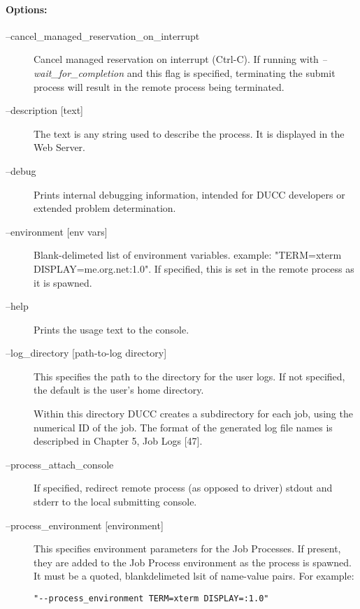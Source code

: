     \paragraph{Options:}
    \begin{description}
    
        \item[--cancel\_managed\_reservation\_on\_interrupt ] Cancel managed reservation on interrupt
          (Ctrl-C).  If running with {\em--wait\_for\_completion} and this flag is specified,
          terminating the submit process will result in the remote process being terminated.

        \item[--description {[text]}] The text is any string used to describe the process. It is
          displayed in the Web Server.

        \item[--debug ] Prints internal debugging information, intended for DUCC developers or
          extended problem determination.

        \item[--environment {[env vars]}] Blank-delimeted list of environment variables.  example:
          "TERM=xterm DISPLAY=me.org.net:1.0".  If specified, this is set in the remote process as
          it is spawned.

        \item[--help] Prints the usage text to the console.

        \item[--log\_directory {[path-to-log directory]} ] This specifies the path to the directory
          for the user logs. If not specified, the default is the user's home directory.
          
          Within this directory DUCC creates a subdirectory for each job, using the numerical 
          ID of the job. The format of the generated log file names is descripbed in Chapter 5, Job 
          Logs [47]. 

        \item[--process\_attach\_console] If specified, redirect remote process (as
          opposed to driver) stdout and stderr to the local submitting console.
          
        \item[--process\_environment {[environment]} ] This specifies environment parameters for the
          Job Processes. If present, they are added to the Job Process environment as the process is
          spawned. It must be a quoted, blankdelimeted lsit of name-value pairs. For example:
\begin{verbatim}
"--process_environment TERM=xterm DISPLAY=:1.0" 
\end{verbatim}
          

\end{description}
